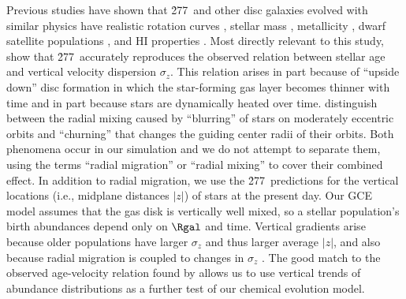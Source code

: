 Previous studies have shown that \h277\ and other disc galaxies evolved with
similar physics have realistic rotation curves 
\citep{Governato2012,Christensen2014},
stellar mass \citep{Munshi2013}, metallicity \citep{Christensen2016},
dwarf satellite populations \citep{Zolotov2012,Brooks2014}, and 
HI properties \citep{Brooks2017}.  
Most directly relevant to this study,
\cite{Bird2020} show that \h277\ accurately reproduces the observed relation
between stellar age and vertical velocity dispersion $\sigma_z$.
This relation arises in part because of ``upside down'' disc formation in
which the star-forming gas layer becomes thinner with time
\citep{Bournaud2009,Forbes2012,Bird2013} and in part because stars are
dynamically heated over time.
\cite{Schoenrich2009a} distinguish between the radial mixing caused by
``blurring'' of stars on moderately eccentric orbits and ``churning'' that
changes the guiding center radii of their orbits.  Both phenomena occur in
our simulation and we do not attempt to separate them, using the terms
``radial migration'' or ``radial mixing'' to cover their combined effect.
In addition to radial migration, we use the \h277\ predictions for the
vertical locations (i.e., midplane distances $|z|$) of stars at the 
present day.  Our GCE model assumes that the gas disk is vertically well
mixed, so a stellar population's birth abundances depend only on $\Rgal$
and time.  Vertical gradients arise because older populations have
larger $\sigma_z$ and thus larger average $|z|$, and also because radial
migration is coupled to changes in $\sigma_z$ \citep{Solway2012}.
The good match to the observed age-velocity relation found by \cite{Bird2020}
allows us to use vertical trends of abundance distributions as a further
test of our chemical evolution model.

